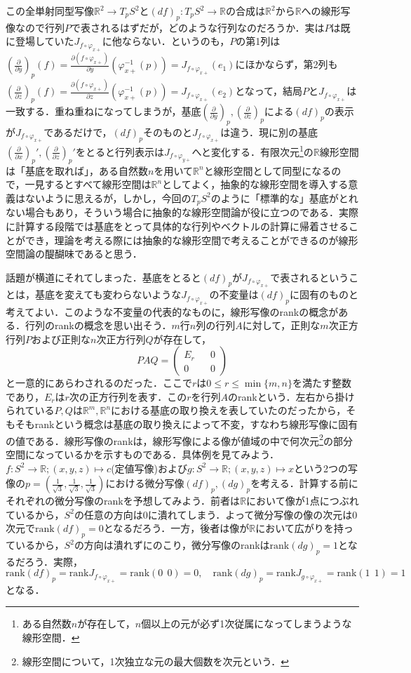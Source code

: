 \documentclass{jsarticle}
\def\vecb{\begin{pmatrix}}
\def\vece{\end{pmatrix}}
\def\realnum{{\mathbb R}}
\def\dfrac{\displaystyle\frac}
\def\rank{{\mathrm{rank}}}
\def\delxp{\left(\dfrac{\partial}{\partial x}\right)_p}
\def\delyp{\left(\dfrac{\partial}{\partial y}\right)_p}
\def\delzp{\left(\dfrac{\partial}{\partial z}\right)_p}
\begin{document}
この全単射同型写像$\realnum^2\rightarrow T_pS^2$と$(df)_p:T_pS^2\rightarrow \realnum$の合成は$\realnum^2$から$\realnum$への線形写像なので行列$P$で表されるはずだが，どのような行列なのだろうか．実は$P$は既に登場していた$J_{f\circ\varphi_{x+}}$に他ならない．というのも，$P$の第1列は$\delyp(f)=\dfrac{\partial (f\circ\varphi_{x+})}{\partial y}(\varphi_{x+}^{-1}(p))=J_{f\circ\varphi_{x+}}(e_1)$にほかならず，第2列も$\delzp(f)=\dfrac{\partial (f\circ\varphi_{x+})}{\partial z}(\varphi_{x+}^{-1}(p))=J_{f\circ\varphi_{x+}}(e_2)$となって，結局$P$と$J_{f\circ\varphi_{x+}}$は一致する．重ね重ねになってしまうが，基底$\delyp,\delzp$による$(df)_p$の表示が$J_{f\circ\varphi_{x+}}$であるだけで，$(df)_p$そのものと$J_{f\circ\varphi_{x+}}$は違う．現に別の基底$\delxp',\delzp'$をとると行列表示は$J_{f\circ\varphi_{y+}}$へと変化する．有限次元\footnote{ある自然数$n$が存在して，$n$個以上の元が必ず1次従属になってしまうような線形空間．}の$\realnum$線形空間は「基底を取れば」，ある自然数$n$を用いて$\realnum^n$と線形空間として同型になるので，一見するとすべて線形空間は$\realnum^n$としてよく，抽象的な線形空間を導入する意義はないように思えるが，しかし，今回の$T_pS^2$のように「標準的な」基底がとれない場合もあり，そういう場合に抽象的な線形空間論が役に立つのである．実際に計算する段階では基底をとって具体的な行列やベクトルの計算に帰着させることができ，理論を考える際には抽象的な線形空間で考えることができるのが線形空間論の醍醐味であると思う．


話題が横道にそれてしまった．基底をとると$(df)_p$が$J_{f\circ\varphi_{x+}}$で表されるということは，基底を変えても変わらないような$J_{f\circ\varphi_{x+}}$の不変量は$(df)_p$に固有のものと考えてよい．このような不変量の代表的なものに，線形写像のrankの概念がある．行列のrankの概念を思い出そう．$m$行$n$列の行列$A$に対して，正則な$m$次正方行列$P$および正則な$n$次正方行列$Q$が存在して，
$$
PAQ=\vecb E_r && 0 \\ 0 && 0 \vece
$$
と一意的にあらわされるのだった．ここで$r$は$0\le r \le \min\{m,n\}$を満たす整数であり，$E_r$は$r$次の正方行列を表す．この$r$を行列$A$のrankという．左右から掛けられている$P,Q$は$\realnum^m,\realnum^n$における基底の取り換えを表していたのだったから，そもそもrankという概念は基底の取り換えによって不変，すなわち線形写像に固有の値である．線形写像のrankは，線形写像による像が値域の中で何次元\footnote{線形空間について，1次独立な元の最大個数を次元という．}の部分空間になっているかを示すものである．具体例を見てみよう．$f:S^2\rightarrow\realnum;(x,y,z)\mapsto c$(定値写像)および$g:S^2\rightarrow\realnum;(x,y,z)\mapsto x$という2つの写像の$p=(\frac{1}{\sqrt{3}},\frac{1}{\sqrt{3}},\frac{1}{\sqrt{3}})$における微分写像$(df)_p,(dg)_p$を考える．計算する前にそれぞれの微分写像のrankを予想してみよう．前者は$\realnum$において像が1点につぶれているから，$S^2$の任意の方向は0に潰れてしまう．よって微分写像の像の次元は0次元で$\rank(df)_p=0$となるだろう．一方，後者は像が$\realnum$において広がりを持っているから，$S^2$の方向は潰れずにのこり，微分写像のrankは$\rank(dg)_p=1$となるだろう．実際，
$$
\rank(df)_p=\rank J_{f\circ\varphi_{x+}}=\rank(0\:\:0)=0,\quad\rank(dg)_p=\rank J_{g\circ\varphi_{x+}}=\rank(1\:\:1)=1
$$
となる．
\end{document}
